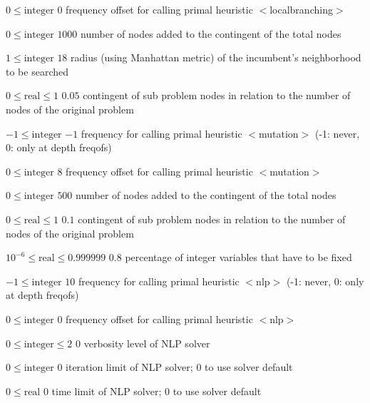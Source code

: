 %
{$0\leq\textrm{integer}$}%
{$0$}%
{frequency offset for calling primal heuristic $<$localbranching$>$}%
{}

%
{$0\leq\textrm{integer}$}%
{$1000$}%
{number of nodes added to the contingent of the total nodes}%
{}

%
{$1\leq\textrm{integer}$}%
{$18$}%
{radius (using Manhattan metric) of the incumbent's neighborhood to be searched}%
{}

%
{$0\leq\textrm{real}\leq1$}%
{$0.05$}%
{contingent of sub problem nodes in relation to the number of nodes of the original problem}%
{}

%
{$-1\leq\textrm{integer}$}%
{$-1$}%
{frequency for calling primal heuristic $<$mutation$>$ (-1: never, 0: only at depth freqofs)}%
{}

%
{$0\leq\textrm{integer}$}%
{$8$}%
{frequency offset for calling primal heuristic $<$mutation$>$}%
{}

%
{$0\leq\textrm{integer}$}%
{$500$}%
{number of nodes added to the contingent of the total nodes}%
{}

%
{$0\leq\textrm{real}\leq1$}%
{$0.1$}%
{contingent of sub problem nodes in relation to the number of nodes of the original problem}%
{}

%
{$10^{- 6}\leq\textrm{real}\leq0.999999$}%
{$0.8$}%
{percentage of integer variables that have to be fixed }%
{}

%
{$-1\leq\textrm{integer}$}%
{$10$}%
{frequency for calling primal heuristic $<$nlp$>$ (-1: never, 0: only at depth freqofs)}%
{}

%
{$0\leq\textrm{integer}$}%
{$0$}%
{frequency offset for calling primal heuristic $<$nlp$>$}%
{}

%
{$0\leq\textrm{integer}\leq2$}%
{$0$}%
{verbosity level of NLP solver}%
{}

%
{$0\leq\textrm{integer}$}%
{$0$}%
{iteration limit of NLP solver; 0 to use solver default}%
{}

%
{$0\leq\textrm{real}$}%
{$0$}%
{time limit of NLP solver; 0 to use solver default}%
{}

